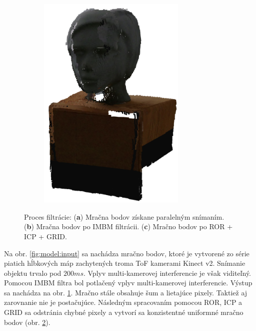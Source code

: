 \begin{figure}[H]
\begin{subfigure}[b]{0.32\textwidth}
		\caption{}
		\label{fig:model:imbm}
	\end{subfigure}
	\hfill
	\begin{subfigure}[b]{0.32\textwidth}
		\centering
		\includegraphics[width=0.78\textwidth]{figures/model_output.png}
		\caption{}
		\label{fig:model:result}
	\end{subfigure}
	\caption{Proces filtrácie: (\textbf{a}) Mračna bodov získane paralelným snímaním. (\textbf{b}) Mračna bodov po IMBM filtrácii. (\textbf{c}) Mračno bodov po ROR + ICP + GRID.}
	\label{fig:model}
\end{figure}


Na obr. \ref{fig:model:input} sa nachádza mračno bodov, ktoré je vytvorené zo série piatich hĺbkových máp zachytených troma ToF kamerami Kinect v2. Snímanie objektu trvalo pod $200ms$. Vplyv multi-kamerovej interferencie je však viditeľný. Pomocou IMBM filtra bol potlačený vplyv multi-kamerovej interferencie. Výstup sa nachádza na obr. \ref{fig:model:imbm}. Mračno stále obsahuje šum a lietajúce pixely. Taktiež aj zarovnanie nie je postačujúce. Následným spracovaním pomocou ROR, ICP a GRID sa odstránia chybné pixely a vytvorí sa konzistentné uniformné mračno bodov (obr. \ref{fig:model:result}).



